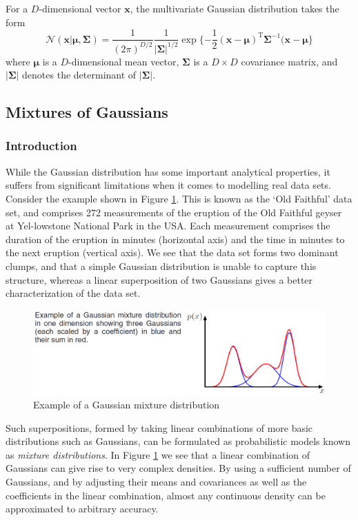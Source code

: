 \documentclass[a4paper, 11pt]{article}
\numberwithin{equation}{subsection}
\begin{document}
For a $D$-dimensional vector $\mathbf x$, the multivariate Gaussian distribution takes the form
\begin{equation}
\mathcal N(\mathbf x|\boldsymbol\mu,\boldsymbol\Sigma)=\frac{1}{(2\pi)^{D/2}}\frac{1}{|\boldsymbol\Sigma|^{1/2}}\exp\{-\frac{1}{2}(\mathbf x-\boldsymbol\mu)^{\mathrm T}\boldsymbol\Sigma^{-1}(\mathbf x-\boldsymbol\mu\}
\end{equation}
where $\boldsymbol\mu$ is a $D$-dimensional mean vector, $\boldsymbol\Sigma$ is a $D\times D$ covariance matrix, and $|\boldsymbol\Sigma|$ denotes the determinant of $|\boldsymbol\Sigma|$.
\subsection{Mixtures of Gaussians}
\subsubsection{Introduction}
While the Gaussian distribution has some important analytical properties, it suffers from significant limitations when it comes to modelling real data sets. Consider the example shown in Figure \ref{fig:fig1}. This is known as the ‘Old Faithful’ data set, and comprises 272 measurements of the eruption of the Old Faithful geyser at Yel-lowstone National Park in the USA. Each measurement comprises the duration of the eruption in minutes (horizontal axis) and the time in minutes to the next eruption (vertical axis). We see that the data set forms two dominant clumps, and that a simple Gaussian distribution is unable to capture this structure, whereas a linear superposition of two Gaussians gives a better characterization of the data set.
\begin{figure}[ht]
\centering
\includegraphics[width=17cm]{fig1.png}
\caption{Example of a Gaussian mixture distribution}
\label{fig:fig1}
\end{figure}

Such superpositions, formed by taking linear combinations of more basic distributions such as Gaussians, can be formulated as probabilistic models known as \emph{mixture distributions}. In Figure \ref{fig:fig1} we see that a linear combination of Gaussians can give rise to very complex densities. By using a sufficient number of Gaussians, and by adjusting their means and covariances as well as the coefficients in the linear combination, almost any continuous density can be approximated to arbitrary accuracy.
\end{document}
